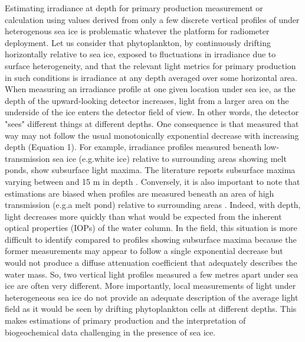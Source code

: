 Estimating irradiance at depth for primary production measurement or calculation using \ked{} values derived from only a few discrete vertical profiles of \edz{} under heterogenous sea ice is problematic whatever the platform for radiometer deployment. Let us consider that phytoplankton, by continuously drifting horizontally relative to sea ice, \DIFdelbegin {}\DIFdelend \DIFaddbegin {}\DIFaddend exposed to fluctuations in irradiance due to surface heterogeneity, and that the relevant light metrics for primary production in such conditions is irradiance at any depth averaged over some horizontal area. When measuring an irradiance profile at one given location under sea ice, as the depth of the upward-looking detector increases, light from a larger area on the underside of the ice enters the detector field of view. In other words, the detector "sees" different things at different depths. One consequence is that \edz{} measured that way may not follow the usual monotonically exponential decrease with increasing depth (Equation 1). For example, irradiance profiles measured beneath low-transmission sea ice (e.g.\DIFaddbegin \DIFadd{, }\DIFaddend white ice) relative to surrounding areas showing melt ponds, show subsurface light maxima. The literature reports subsurface maxima varying between \DIFdelbegin {}\DIFdelend \DIFaddbegin {}\DIFaddend and 15 m in depth \citep{Frey2011, Katlein2016, Laney2017}. Conversely, it is also important to note that \ked{} estimations are biased when profiles are measured beneath an area of high transmission (e.g.\DIFaddbegin \DIFadd{, }\DIFaddend a melt pond) relative to surrounding areas \citep{Katlein2016}. Indeed, with depth, light decreases more quickly than what would be expected from the inherent optical properties (IOPs) of the water column. In the field, this situation is more difficult to identify compared to profiles showing subsurface maxima because the former measurements may appear to follow a single exponential decrease but would not produce a diffuse attenuation coefficient that adequately describes the water mass. So, two vertical light profiles measured a few metres apart under sea ice are often very different. More importantly, local measurements of light under heterogeneous sea ice do not provide an adequate description of the average light field as it would be seen by drifting phytoplankton cells at different depths. This makes estimations of primary production and the interpretation of biogeochemical data challenging in the presence of sea ice.

